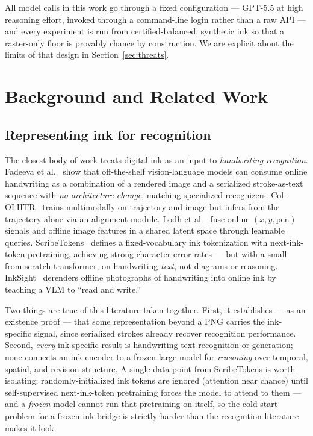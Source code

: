 \documentclass[11pt]{article}
\begin{document}
All model calls in this work go through a fixed configuration --- GPT-5.5 at high
reasoning effort, invoked through a command-line login rather than a raw API ---
and every experiment is run from certified-balanced, synthetic ink so that a
raster-only floor is provably chance by construction. We are explicit about the
limits of that design in Section~\ref{sec:threats}.

\section{Background and Related Work}
\label{sec:related}

\subsection{Representing ink for recognition}
The closest body of work treats digital ink as an input to \emph{handwriting
recognition}. Fadeeva et al.~\cite{fadeeva2024} show that off-the-shelf
vision-language models can consume online handwriting as a combination of a
rendered image and a serialized stroke-as-text sequence with \emph{no
architecture change}, matching specialized recognizers. Col-OLHTR~\cite{cololhtr}
trains multimodally on trajectory and image but infers from the trajectory alone
via an alignment module. Lodh et al.~\cite{lodh2025} fuse online $(x,y,\text{pen})$
signals and offline image features in a shared latent space through learnable
queries. ScribeTokens~\cite{scribetokens} defines a fixed-vocabulary ink
tokenization with next-ink-token pretraining, achieving strong character error
rates --- but with a small from-scratch transformer, on handwriting \emph{text},
not diagrams or reasoning. InkSight~\cite{inksight} derenders offline photographs
of handwriting into online ink by teaching a VLM to ``read and write.''

Two things are true of this literature taken together. First, it establishes ---
as an existence proof --- that some representation beyond a PNG carries the
ink-specific signal, since serialized strokes already recover recognition
performance. Second, \emph{every} ink-specific result is handwriting-text
recognition or generation; none connects an ink encoder to a frozen large model
for \emph{reasoning} over temporal, spatial, and revision structure. A single
data point from ScribeTokens is worth isolating: randomly-initialized ink tokens
are ignored (attention near chance) until self-supervised next-ink-token
pretraining forces the model to attend to them --- and a \emph{frozen} model
cannot run that pretraining on itself, so the cold-start problem for a frozen
ink bridge is strictly harder than the recognition literature makes it look.
\end{document}
